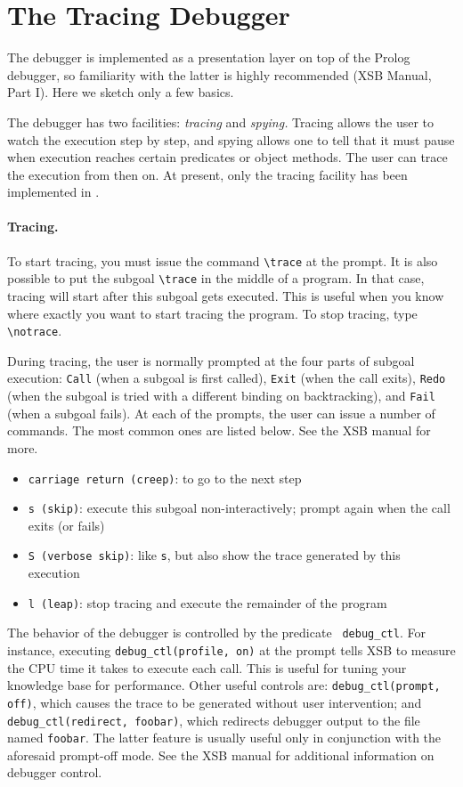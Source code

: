 \documentclass[11pt]{article}
\newcommand{\ERGO}{\mbox{\smaller{\ensuremath{\cal{E}}\smaller{{\sc{RGO}}}}}\xspace}
\newcommand{\FLSYSTEM}{\ERGO}
\newcommand{\bs}{\textbackslash}
\begin{document}
\section{The \FLSYSTEM Tracing Debugger}\label{sec-debugger}


The \FLSYSTEM debugger is implemented as a presentation layer on top of the Prolog
debugger, so familiarity with the latter is highly recommended (XSB Manual,
Part I). Here we sketch only a few basics.

The debugger has two facilities: \emph{tracing} and \emph{spying.} Tracing
allows the user to watch the execution step by step, and
spying allows one to tell \FLSYSTEM that it must pause when execution reaches
certain predicates or object methods. The user can trace the execution from
then on. At present, only the tracing facility has been implemented in
\FLSYSTEM.

\index{\bs{}trace}
\index{\bs{}notrace}
\paragraph{Tracing.}
To start tracing, you must issue the command {\tt \bs{}trace} at the
\FLSYSTEM prompt. It is also possible to put the subgoal {\tt \bs{}trace} in
the middle of a program. In that case, tracing will start after this
subgoal gets executed. This is useful when you know where exactly you want
to start tracing the program. To stop tracing, type {\tt \bs{}notrace}.

During tracing, the user is normally prompted at the four parts of subgoal
execution: {\tt Call} (when a subgoal is first called), {\tt Exit} (when
the call exits), {\tt Redo} (when the subgoal is tried with a different
binding on backtracking), and {\tt Fail} (when a subgoal fails).
At each of the prompts, the user can issue a number of commands. The most
common ones are listed below. See the XSB manual for more.
\begin{itemize}
  \item {\tt carriage return (creep)}:  to go to the next step  
  \item {\tt s (skip)}: execute this subgoal non-interactively; prompt
    again when the call exits (or fails)
  \item {\tt S (verbose skip)}: like {\tt s}, but also show the trace
    generated by this execution
  \item {\tt l (leap)}: stop tracing and execute the remainder of the
    program
\end{itemize}
The behavior of the debugger is controlled by the predicate {\tt
  debug\_ctl}. For instance, executing {\tt debug\_ctl(profile, on)} at the
\FLSYSTEM prompt tells XSB to measure the CPU time it takes to execute each
call. This is useful for tuning your knowledge base for performance. Other useful
controls are: {\tt debug\_ctl(prompt, off)}, which causes the trace to be
generated without user intervention; and {\tt debug\_ctl(redirect,
  foobar)}, which redirects debugger output to the file named {\tt foobar}.
The latter feature is usually useful only in conjunction with the aforesaid
prompt-off mode. See the XSB manual for additional information on debugger
control.
\end{document}
